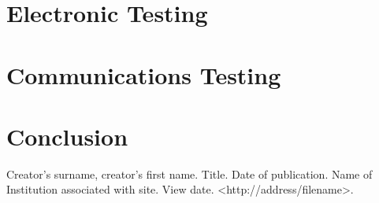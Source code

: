 \documentclass[a4paper,11pt]{report}
\let\Oldsection\section
\renewcommand{\section}{\FloatBarrier\Oldsection}
\begin{document}
\chapter{Electronic Testing} \label{sec_Electro Testing}


\chapter{Communications Testing}


\chapter{Conclusion}


\clearpage
\printbibliography[heading=bibintoc]
Creator’s surname, creator’s first name. Title. Date of
publication. Name of Institution associated with site. View date. <http://address/filename>.\\

\appendix
\addappheadtotoc
\graphicspath{{./Sections/PDFs/}}





\end{document}
